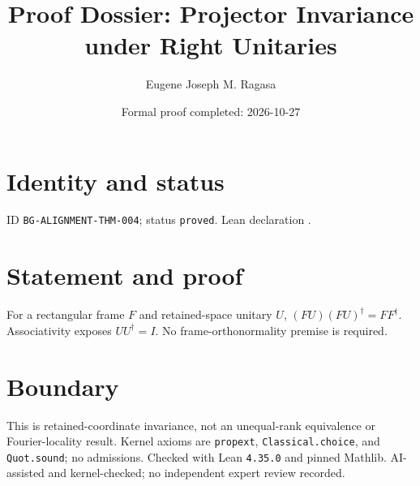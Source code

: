 \documentclass[11pt]{article}
\title{Proof Dossier: Projector Invariance under Right Unitaries}\author{Eugene Joseph M. Ragasa}\date{Formal proof completed: 2026-10-27}
\begin{document}
\maketitle
\section{Identity and status}
ID \texttt{BG-ALIGNMENT-THM-004}; status \texttt{proved}. Lean declaration .
\section{Statement and proof}
For a rectangular frame $F$ and retained-space unitary $U$, $(FU)(FU)^\dagger=FF^\dagger$. Associativity exposes $UU^\dagger=I$. No frame-orthonormality premise is required.
\section{Boundary}
This is retained-coordinate invariance, not an unequal-rank equivalence or Fourier-locality result. Kernel axioms are \texttt{propext}, \texttt{Classical.choice}, and \texttt{Quot.sound}; no admissions. Checked with Lean \texttt{4.35.0} and pinned Mathlib. AI-assisted and kernel-checked; no independent expert review recorded.
\end{document}
